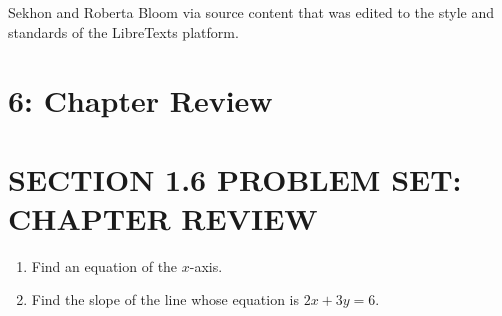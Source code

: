 Sekhon and Roberta Bloom via source content that was edited to the style and standards of the LibreTexts platform.

\section*{6: Chapter Review}
\section*{SECTION 1.6 PROBLEM SET: CHAPTER REVIEW}
\begin{enumerate}
  \item Find an equation of the $x$-axis.
  \item Find the slope of the line whose equation is $2 x+3 y=6$.
\end{enumerate}

